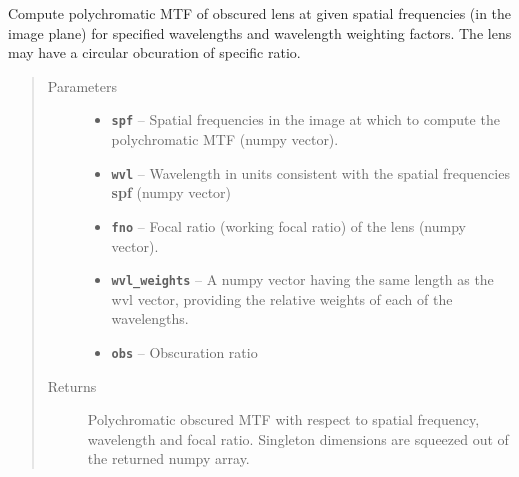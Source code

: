 \documentclass[a4paper,10pt,english]{sphinxmanual}
\begin{document}
\begin{fulllineitems}
\label{packages:optics.pmtf_obs}
Compute polychromatic MTF of obscured lens at given spatial frequencies (in the image plane) for specified
wavelengths and wavelength weighting factors. The lens may have a circular obcuration of specific ratio.
\begin{quote}\begin{description}
\item[{Parameters}] \leavevmode\begin{itemize}
\item {} 
\textbf{\texttt{spf}} -- Spatial frequencies in the image at which to compute the polychromatic MTF (numpy vector).

\item {} 
\textbf{\texttt{wvl}} -- Wavelength in units consistent with the spatial frequencies \textbf{spf} (numpy vector)

\item {} 
\textbf{\texttt{fno}} -- Focal ratio (working focal ratio) of the lens (numpy vector).

\item {} 
\textbf{\texttt{wvl\_weights}} -- A numpy vector having the same length as the wvl vector, providing the relative weights of each
of the wavelengths.

\item {} 
\textbf{\texttt{obs}} -- Obscuration ratio

\end{itemize}

\item[{Returns}] \leavevmode
Polychromatic obscured MTF with respect to spatial frequency, wavelength and focal ratio.
Singleton dimensions are squeezed out of the returned numpy array.

\end{description}\end{quote}

\end{fulllineitems}

\end{document}
